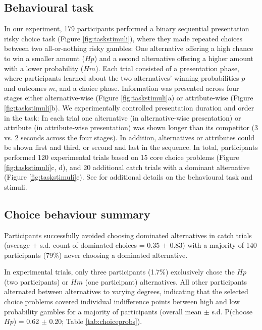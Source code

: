 \documentclass[11pt, a4paper, twocolumn, abstract]{scrartcl}
\begin{document}
\subsection*{Behavioural task}

In our experiment, 179 participants performed a binary sequential presentation risky choice task (Figure \ref{fig:taskstimuli}), where they made repeated choices between two all-or-nothing risky gambles: One alternative offering a high chance to win a smaller amount ($Hp$) and a second alternative offering a higher amount with a lower probability ($Hm$). Each trial consisted of a presentation phase, where participants learned about the two alternatives' winning probabilities $p$ and outcomes $m$, and a choice phase. Information was presented across four stages either alternative-wise (Figure \ref{fig:taskstimuli}a) or attribute-wise (Figure \ref{fig:taskstimuli}b). We experimentally controlled presentation duration and order in the task: In each trial one alternative (in alternative-wise presentation) or attribute (in attribute-wise presentation) was shown longer than its competitor (3 vs. 2 seconds across the four stages). In addition, alternatives or attributes could be shown first and third, or second and last in the sequence. In total, participants performed 120 experimental trials based on 15 core choice problems (Figure \ref{fig:taskstimuli}c, d), and 20 additional catch trials with a dominant alternative (Figure \ref{fig:taskstimuli}e). See  for additional details on the behavioural task and stimuli.

\subsection*{Choice behaviour summary}

Participants successfully avoided choosing dominated alternatives in catch trials (average $\pm$ s.d. count of dominated choices = 0.35 $\pm$ 0.83) with a majority of 140 participants (79\%) never choosing a dominated alternative.

In experimental trials, only three participants (1.7\%) exclusively chose the $Hp$ (two participants) or $Hm$ (one participant) alternatives. All other participants alternated between alternatives to varying degrees, indicating that the selected choice problems covered individual indifference points between high and low probability gambles for a majority of participants (overall mean $\pm$ s.d. P(choose $Hp$) = 0.62 $\pm$ 0.20; Table \ref{tab:choiceprobs}).
\end{document}
